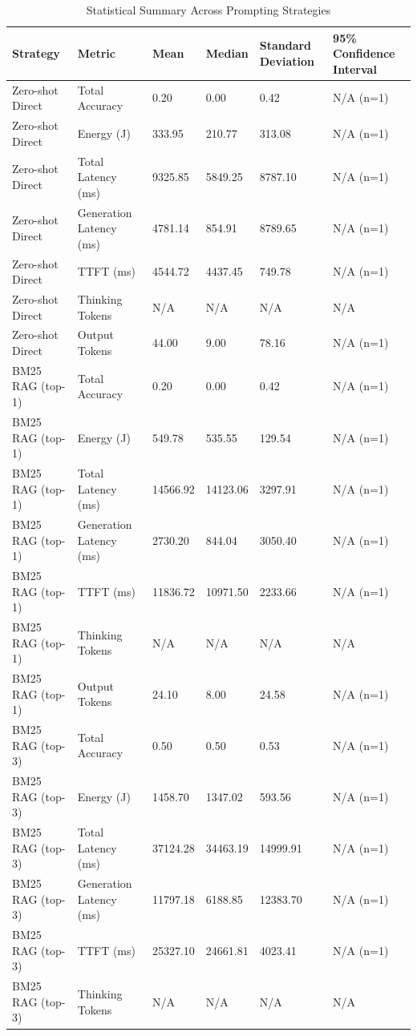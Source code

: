 \begin{table}
\caption{Statistical Summary Across Prompting Strategies}
\label{tab:statistical_summary}
\begin{tabular}{llllll}
\toprule
Strategy & Metric & Mean & Median & Standard Deviation & 95\% Confidence Interval \\
\midrule
Zero-shot Direct & Total Accuracy & 0.20 & 0.00 & 0.42 & N/A (n=1) \\
Zero-shot Direct & Energy (J) & 333.95 & 210.77 & 313.08 & N/A (n=1) \\
Zero-shot Direct & Total Latency (ms) & 9325.85 & 5849.25 & 8787.10 & N/A (n=1) \\
Zero-shot Direct & Generation Latency (ms) & 4781.14 & 854.91 & 8789.65 & N/A (n=1) \\
Zero-shot Direct & TTFT (ms) & 4544.72 & 4437.45 & 749.78 & N/A (n=1) \\
Zero-shot Direct & Thinking Tokens & N/A & N/A & N/A & N/A \\
Zero-shot Direct & Output Tokens & 44.00 & 9.00 & 78.16 & N/A (n=1) \\
BM25 RAG (top-1) & Total Accuracy & 0.20 & 0.00 & 0.42 & N/A (n=1) \\
BM25 RAG (top-1) & Energy (J) & 549.78 & 535.55 & 129.54 & N/A (n=1) \\
BM25 RAG (top-1) & Total Latency (ms) & 14566.92 & 14123.06 & 3297.91 & N/A (n=1) \\
BM25 RAG (top-1) & Generation Latency (ms) & 2730.20 & 844.04 & 3050.40 & N/A (n=1) \\
BM25 RAG (top-1) & TTFT (ms) & 11836.72 & 10971.50 & 2233.66 & N/A (n=1) \\
BM25 RAG (top-1) & Thinking Tokens & N/A & N/A & N/A & N/A \\
BM25 RAG (top-1) & Output Tokens & 24.10 & 8.00 & 24.58 & N/A (n=1) \\
BM25 RAG (top-3) & Total Accuracy & 0.50 & 0.50 & 0.53 & N/A (n=1) \\
BM25 RAG (top-3) & Energy (J) & 1458.70 & 1347.02 & 593.56 & N/A (n=1) \\
BM25 RAG (top-3) & Total Latency (ms) & 37124.28 & 34463.19 & 14999.91 & N/A (n=1) \\
BM25 RAG (top-3) & Generation Latency (ms) & 11797.18 & 6188.85 & 12383.70 & N/A (n=1) \\
BM25 RAG (top-3) & TTFT (ms) & 25327.10 & 24661.81 & 4023.41 & N/A (n=1) \\
BM25 RAG (top-3) & Thinking Tokens & N/A & N/A & N/A & N/A \\

\end{tabular}
\end{table}

